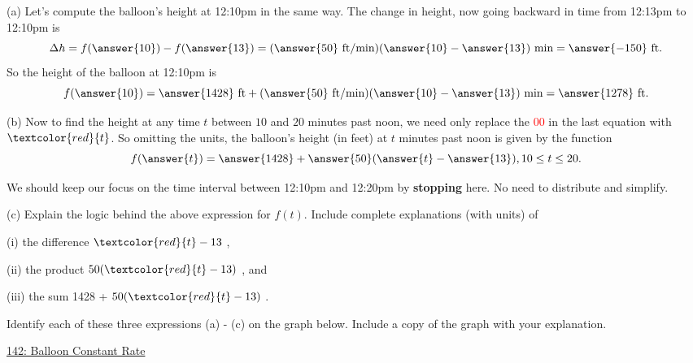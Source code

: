 \documentclass{ximera}
\begin{document}
\begin{example}
\begin{explanation}
\begin{question}  \label{Qdftr343}
(a) Let's compute the balloon's height at 12:10pm in the same way. The change in height, now going backward in time from 12:13pm to 12:10pm is
\[
      \Delta h  = f(\answer{10}) - f(\answer{13}) = (\answer{50} \text{ ft/min})(\answer{10} - \answer{13})\text{ min} = \answer{-150} \text{ ft} .
\]
So the height of the balloon at 12:10pm is
\[
       f(\answer{10}) = \answer{1428}\text{ ft} + (\answer{50} \text{ ft/min})(\answer{10} - \answer{13})\text{ min} = \answer{1278} \text{ ft}.
\]

(b) Now to find the height at any time $t$ between $10$ and $20$ minutes past noon, we need only replace the \textcolor{red}{00} in the last equation with $\textcolor{red}{t}$. So omitting the units, the balloon's height (in feet) at $t$ minutes past noon is given by the function
\[
       f(\answer{t}) = \answer{1428}  + \answer{50}( \answer{t} - \answer{13}) , 10\leq t \leq 20.                   %
\]

We should keep our focus on the time interval between 12:10pm and 12:20pm by {\bf stopping} here. No need to distribute and simplify. 

\begin{freeResponse}
(c) Explain the logic behind the above expression for $f(t)$. Include complete explanations (with units) of 

(i) the difference $\textcolor{red}{t} - 13$ ,

(ii) the product $50(\textcolor{red}{t}-13)$ , and

(iii) the sum 1428  + $50( \textcolor{red}{t} - 13)$  .

Identify each of these three expressions (a) - (c) on the graph below. Include a copy of the graph with your explanation. 
\end{freeResponse}

 
\begin{onlineOnly}
    \begin{center}
\end{center}
\end{onlineOnly}

\href{https://www.desmos.com/calculator/iyva54o8i5}{142: Balloon Constant Rate}

\end{question}

\end{explanation}
\end{example}
\end{document}
